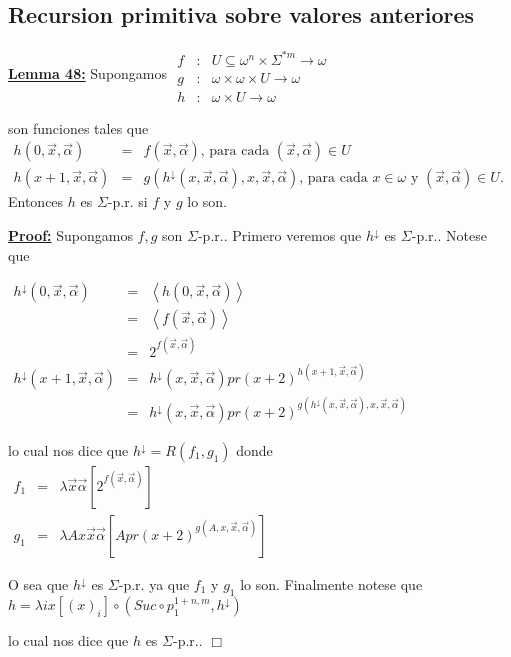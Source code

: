 \subsection{Recursion primitiva sobre valores anteriores}

\textbf{\underline{Lemma 48:}} Supongamos
\(\displaystyle \begin{array}{rcl} f & :& U\subseteq \omega ^{n}\times \Sigma ^{\ast m}\rightarrow \omega \\ g & :& \omega \times \omega \times U\rightarrow \omega \\ h & :& \omega \times U\rightarrow \omega \end{array} \)

son funciones tales que
\(\displaystyle \begin{array}{rcl} h(0,\vec{x},\vec{\alpha}) & =& f(\vec{x},\vec{\alpha})\text{, para cada }(\vec{ x},\vec{\alpha})\in U \\ h(x+1,\vec{x},\vec{\alpha}) & =& g(h^{\downarrow }(x,\vec{x},\vec{\alpha}),x, \vec{x},\vec{\alpha})\text{, para cada }x\in \omega \text{ y }(\vec{x},\vec{ \alpha})\in U\text{.} \end{array} \)
Entonces \(h\) es \(\Sigma \)-p.r. si \(f\) y \(g\) lo son.

\textbf{\underline{Proof:}} Supongamos \(f,g\) son \(\Sigma \)-p.r.. Primero veremos que \(h^{\downarrow }\) es \(\Sigma \)-p.r.. Notese que

\(\displaystyle \begin{array}{rcl} h^{\downarrow }(0,\vec{x},\vec{\alpha}) & =& \left\langle h(0,\vec{x},\vec{ \alpha})\right\rangle \\ & =& \left\langle f(\vec{x},\vec{\alpha})\right\rangle \\ & =& 2^{f(\vec{x},\vec{\alpha})} \\ h^{\downarrow }(x+1,\vec{x},\vec{\alpha}) & =& h^{\downarrow }(x,\vec{x},\vec{ \alpha})pr(x+2)^{h(x+1,\vec{x},\vec{\alpha})} \\ & =& h^{\downarrow }(x,\vec{x},\vec{\alpha})pr(x+2)^{g(h^{\downarrow }(x,\vec{x },\vec{\alpha}),x,\vec{x},\vec{\alpha})} \end{array} \)

lo cual nos dice que \(h^{\downarrow }=R(f_{1},g_{1})\) donde
\(\displaystyle \begin{array}{rcl} f_{1} & =& \lambda \vec{x}\vec{\alpha}\left[ 2^{f(\vec{x},\vec{\alpha})}\right] \\ g_{1} & =& \lambda Ax\vec{x}\vec{\alpha}\left[ Apr(x+2)^{g(A,x,\vec{x},\vec{ \alpha})}\right] \end{array} \)

O sea que \(h^{\downarrow }\) es \(\Sigma \)-p.r. ya que \(f_{1}\) y \(g_{1}\) lo son. Finalmente notese que
\(\displaystyle h=\lambda ix[(x)_{i}]\circ (Suc\circ p_{1}^{1+n,m},h^{\downarrow }) \)

lo cual nos dice que \(h\) es \(\Sigma \)-p.r.. \(\Box\)
